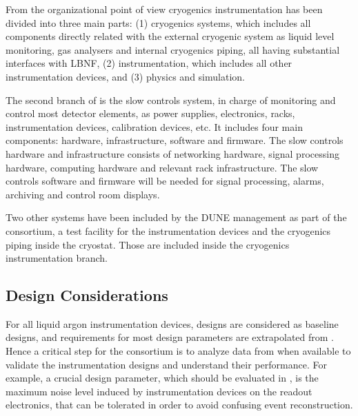 From the organizational point of view
cryogenics instrumentation has been divided into three main parts: (1) cryogenics systems, which includes all components directly related with the external cryogenic system as
liquid level monitoring, gas analysers and internal cryogenics piping, all having substantial interfaces with LBNF, (2) \lar  instrumentation, which includes all
other instrumentation devices, and (3) physics and simulation.


The second branch of  is the slow controls system, in charge of monitoring and control most detector elements, as power supplies, electronics, racks, instrumentation devices,
calibration devices, etc. It includes four main components: hardware, infrastructure,
software and firmware. The slow controls hardware and infrastructure consists of
networking hardware, signal processing hardware, computing hardware and relevant
rack infrastructure. The slow controls software and firmware will be needed for
signal processing, alarms, archiving and control room displays.

Two other systems have been included by the DUNE management as part of the  consortium,
a test facility for the instrumentation devices and the cryogenics piping inside the cryostat.
Those are included inside the cryogenics instrumentation branch.



\subsection{Design Considerations}
\label{sec:fddp-slow-cryo-des-consid}


For all liquid argon instrumentation devices,  designs are
considered as baseline designs, and requirements for most design
parameters are extrapolated from . Hence a critical step for
the  consortium is to analyze data from  when available
to validate the instrumentation designs and understand their
performance. For example, a crucial design parameter, which should be evaluated in ,
is the maximum noise level induced by instrumentation devices on the readout electronics, that can be tolerated 
in order to avoid confusing event reconstruction. 

